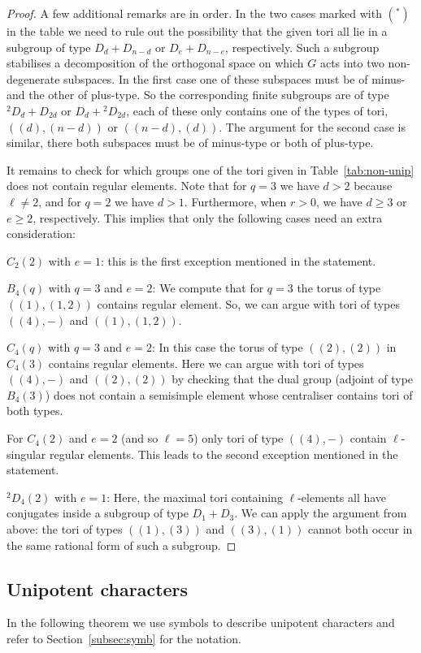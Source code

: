 \documentclass{ert-l}
\newcommand{\tw}[1]{{}^#1\!}
\theoremstyle{definition}
\theoremstyle{remark}
\begin{document}
\begin{proof}
A few additional remarks are in order. In the two cases marked with $(^*)$ in
the table we need to rule out the possibility that the given tori all lie in
a subgroup of type $D_d + D_{n-d}$ or $D_e + D_{n-e}$, respectively.
Such a subgroup stabilises a decomposition of the orthogonal space on which $G$
acts into two non-degenerate subspaces. In the
first case one of these subspaces must be of minus- and the other of plus-type.
So the corresponding finite subgroups are of type $\tw2D_d+D_{2d}$ or
$D_d+\tw2D_{2d}$, each of these only contains one of the types of tori,
$((d),(n-d))$ or $((n-d),(d))$. The argument for the second case is similar,
there both subspaces must be of minus-type or both of plus-type.

It remains to check for which groups one of the tori given in
Table~\ref{tab:non-unip} does not contain regular elements.
Note that for $q=3$ we have $d > 2$ because $\ell \neq 2$, and for $q=2$ we
have $d > 1$. Furthermore, when $r>0$, we have $d\geq 3$ or $e \geq 2$,
respectively. This implies that only the following cases need an extra
consideration:

$C_2(2)$ with $e=1$: this is the first exception mentioned in the statement.

$B_4(q)$ with $q=3$ and $e=2$: We compute that for $q=3$ the torus of type
$((1),(1,2))$ contains regular element. So, we can argue with tori of types
$((4),-)$ and $((1),(1,2))$.

$C_4(q)$ with $q=3$ and $e=2$: In this case the torus of type $((2),(2))$
in $C_4(3)$ contains regular elements.
Here we can argue with tori of types $((4),-)$
and $((2),(2))$ by checking that the dual group (adjoint of type $B_4(3)$)
does not contain a semisimple element whose centraliser contains tori of
both types.

For $C_4(2)$ and $e=2$ (and so $\ell = 5$) only tori of type
$((4),-)$ contain $\ell$-singular regular elements.
This leads to the second exception mentioned in the statement.

$\tw2D_4(2)$ with $e=1$: Here, the maximal tori containing $\ell$-elements all
have conjugates inside a subgroup of type $D_1+D_3$. We can apply the argument
from above: the tori of types $((1),(3))$ and $((3),(1))$ cannot both occur in
the same rational form of such a subgroup.
\end{proof}

\subsection{Unipotent characters}   \label{ssec:unipotent}
In the following theorem we use symbols to describe unipotent characters
and refer to Section~\ref{subsec:symb} for the notation.
\end{document}
